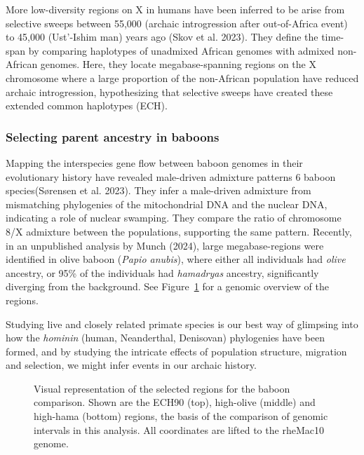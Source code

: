 \documentclass[
  11pt,
  a4paper,
]{scrbook}
\let\oldemph\emph
\renewcommand\emph[1]{\oldemph{\color{gray}#1}}
\begin{document}
More low-diversity regions on X in humans have been inferred to be arise
from selective sweeps between 55,000 (archaic introgression after
out-of-Africa event) to 45,000 (Ust'-Ishim man) years ago (Skov et al.
2023). They define the time-span by comparing haplotypes of unadmixed
African genomes with admixed non-African genomes. Here, they locate
megabase-spanning regions on the X chromosome where a large proportion
of the non-African population have reduced archaic introgression,
hypothesizing that selective sweeps have created these extended common
haplotypes (ECH).

\subsubsection{Selecting parent ancestry in
baboons}\label{selecting-parent-ancestry-in-baboons}

Mapping the interspecies gene flow between baboon genomes in their
evolutionary history have revealed male-driven admixture patterns 6
baboon species(Sørensen et al. 2023). They infer a male-driven admixture
from mismatching phylogenies of the mitochondrial DNA and the nuclear
DNA, indicating a role of nuclear swamping. They compare the ratio of
chromosome 8/X admixture between the populations, supporting the same
pattern. Recently, in an unpublished analysis by Munch (2024), large
megabase-regions were identified in olive baboon (\emph{Papio anubis}),
where either all individuals had \emph{olive} ancestry, or 95\% of the
individuals had \emph{hamadryas} ancestry, significantly diverging from
the background. See Figure~\ref{fig-introduce-selected-regions} for a
genomic overview of the regions.

Studying live and closely related primate species is our best way of
glimpsing into how the \emph{hominin} (human, Neanderthal, Denisovan)
phylogenies have been formed, and by studying the intricate effects of
population structure, migration and selection, we might infer events in
our archaic history.

\begin{figure}[H]


\caption{\label{fig-introduce-selected-regions}Visual representation of
the selected regions for the baboon comparison. Shown are the ECH90
(top), high-olive (middle) and high-hama (bottom) regions, the basis of
the comparison of genomic intervals in this analysis. All coordinates
are lifted to the rheMac10 genome.}

\end{figure}%
\end{document}
